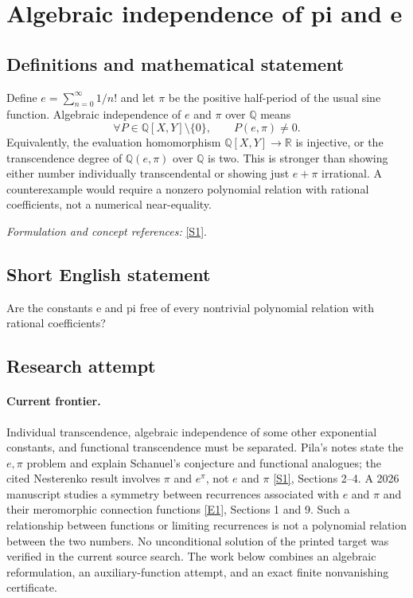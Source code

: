 \documentclass[11pt,a4paper]{article}
\newcommand{\Q}{\mathbb{Q}}
\newcommand{\R}{\mathbb{R}}
\newcommand{\sref}[2]{\hyperlink{source:#1:#2}{[S#2]}}
\newcommand{\eref}[2]{\hyperlink{extra:#1:#2}{[E#2]}}
\newif\ifshowcatalogue
\newcommand{\cataloguescope}[1]{\ifshowcatalogue
 \paragraph{Exact scope in the supplied catalogue.}
 \begin{quote}\small #1\end{quote}\fi}
\numberwithin{equation}{section}
\begin{document}
\setcounter{section}{0}
\clearpage
\section*{\texorpdfstring{Algebraic independence of pi and e}{Algebraic independence of pi and e}}\label{3349}
\subsection{Definitions and mathematical statement}
Define $e=\sum_{n=0}^{\infty}1/n!$ and let $\pi$ be the positive half-period of the usual sine function. Algebraic independence of $e$ and $\pi$ over $\Q$ means
\[
 \forall P\in\Q[X,Y]\setminus\{0\},\qquad P(e,\pi)\ne0.
\]
Equivalently, the evaluation homomorphism $\Q[X,Y]\to\R$ is injective, or the transcendence degree of $\Q(e,\pi)$ over $\Q$ is two. This is stronger than showing either number individually transcendental or showing just $e+\pi$ irrational. A counterexample would require a nonzero polynomial relation with rational coefficients, not a numerical near-equality.
\par\smallskip\textit{Formulation and concept references:} \sref{3349}{1}.
\cataloguescope{Prove that no nonzero polynomial P in Q[X,Y] satisfies P(e,pi)=0.}
\subsection{Short English statement}
Are the constants e and pi free of every nontrivial polynomial relation with rational coefficients?
\subsection{Research attempt}

\paragraph{Current frontier.}
Individual transcendence, algebraic independence of some other
exponential constants, and functional transcendence must be separated.
Pila's notes state the $e,\pi$ problem and explain Schanuel's conjecture
and functional analogues; the cited Nesterenko result involves
$\pi$ and $e^\pi$, not $e$ and $\pi$ \sref{3349}{1}, Sections 2--4.
A 2026 manuscript studies a symmetry between recurrences associated
with $e$ and $\pi$ and their meromorphic connection functions
\eref{3349}{1}, Sections 1 and 9. Such a relationship between functions
or limiting recurrences is not a polynomial relation between the two
numbers. No unconditional solution of the printed target was verified
in the current source search. The work below combines an algebraic
reformulation, an auxiliary-function attempt, and an exact finite
nonvanishing certificate.
\end{document}
